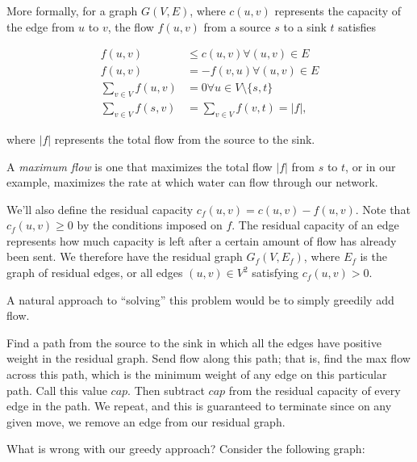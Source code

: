 \documentclass[11pt]{book}
\begin{document}
More formally, for a graph $G(V,E)$, where $c(u,v)$ represents the capacity of the edge from $u$ to $v$, the flow $f(u,v)$ from a source $s$ to a sink $t$ satisfies

\begin{align*}
f(u,v) &\le c(u,v) \forall (u,v) \in E \\
f(u,v) &= -f(v,u) \forall (u,v) \in E \\
\sum_{v \in V} f(u,v) &= 0 \forall u \in V \setminus \{s,t\} \\
\sum_{v \in V} f(s,v) &= \sum_{v \in V} f(v,t) = |f|,
\end{align*}

where $|f|$ represents the total flow from the source to the sink.

A \textit{maximum flow} is one that maximizes the total flow $|f|$ from $s$ to $t$, or in our example, maximizes the rate at which water can flow through our network.

We'll also define the residual capacity $c_f(u,v) = c(u,v) - f(u,v)$. Note that $c_f(u,v) \ge 0$ by the conditions imposed on $f$. The residual capacity of an edge represents how much capacity is left after a certain amount of flow has already been sent. We therefore have the residual graph $G_f(V,E_f)$, where $E_f$ is the graph of residual edges, or all edges $(u,v) \in V^2$ satisfying $c_f(u,v) > 0$.

A natural approach to ``solving'' this problem would be to simply greedily add flow.

Find a path from the source to the sink in which all the edges have positive weight in the residual graph. Send flow along this path; that is, find the max flow across this path, which is the minimum weight of any edge on this particular path. Call this value $cap$. Then subtract $cap$ from the residual capacity of every edge in the path. We repeat, and this is guaranteed to terminate since on any given move, we remove an edge from our residual graph.

What is wrong with our greedy approach? Consider the following graph:

\begin{center}
\end{center}
\end{document}
